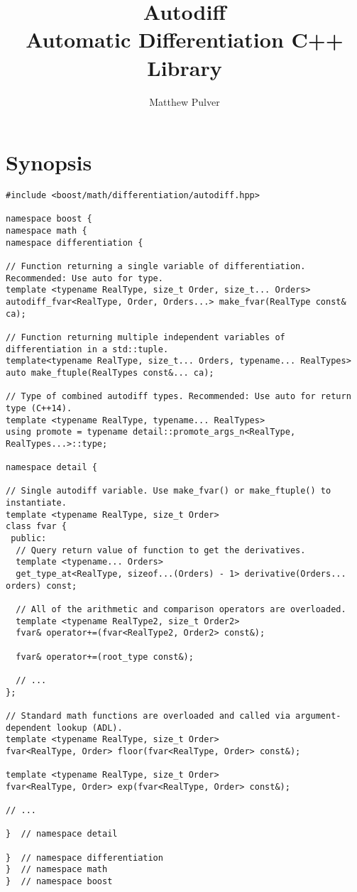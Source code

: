 \documentclass{article}
\begin{document}
\title{Autodiff\\
\large Automatic Differentiation C++ Library}
\author{Matthew Pulver}
\maketitle



\section{Synopsis}

\begingroup
\fontsize{10pt}{10pt}\selectfont
\begin{verbatim}
#include <boost/math/differentiation/autodiff.hpp>

namespace boost {
namespace math {
namespace differentiation {

// Function returning a single variable of differentiation. Recommended: Use auto for type.
template <typename RealType, size_t Order, size_t... Orders>
autodiff_fvar<RealType, Order, Orders...> make_fvar(RealType const& ca);

// Function returning multiple independent variables of differentiation in a std::tuple.
template<typename RealType, size_t... Orders, typename... RealTypes>
auto make_ftuple(RealTypes const&... ca);

// Type of combined autodiff types. Recommended: Use auto for return type (C++14).
template <typename RealType, typename... RealTypes>
using promote = typename detail::promote_args_n<RealType, RealTypes...>::type;

namespace detail {

// Single autodiff variable. Use make_fvar() or make_ftuple() to instantiate.
template <typename RealType, size_t Order>
class fvar {
 public:
  // Query return value of function to get the derivatives.
  template <typename... Orders>
  get_type_at<RealType, sizeof...(Orders) - 1> derivative(Orders... orders) const;

  // All of the arithmetic and comparison operators are overloaded.
  template <typename RealType2, size_t Order2>
  fvar& operator+=(fvar<RealType2, Order2> const&);

  fvar& operator+=(root_type const&);

  // ...
};

// Standard math functions are overloaded and called via argument-dependent lookup (ADL).
template <typename RealType, size_t Order>
fvar<RealType, Order> floor(fvar<RealType, Order> const&);

template <typename RealType, size_t Order>
fvar<RealType, Order> exp(fvar<RealType, Order> const&);

// ...

}  // namespace detail

}  // namespace differentiation
}  // namespace math
}  // namespace boost
\end{verbatim}
\endgroup
\end{document}
